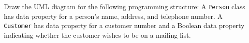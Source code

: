Draw the UML diagram for the following programming structure: A \texttt{Person} class has data property for a person's name, address, and telephone number. A \texttt{Customer} has data property for a customer number and a Boolean data property indicating whether the customer wishes to be on a mailing list.